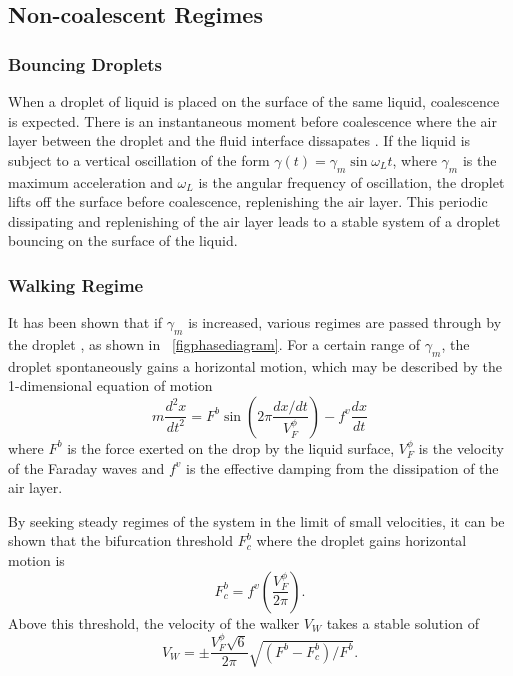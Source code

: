 \documentclass[11pt,twocolumn]{article}
\newcommand{\figref}[2][\figurename~]{#1\ref{#2}}
\begin{document}

\subsection{Non-coalescent Regimes}
\label{secnoncoalescentregimes}

\subsubsection{Bouncing Droplets}
\label{sec:bouncingregime}

When a droplet of liquid is placed on the surface of the same liquid, coalescence is expected.  There is an instantaneous moment before coalescence where the air layer between the droplet and the fluid interface dissapates \cite{2}.  If the liquid is subject to a vertical oscillation of the form $\gamma(t)=\gamma_m\sin\omega_L t$, where $\gamma_m$ is the maximum acceleration and $\omega_L$ is the angular frequency of oscillation, the droplet lifts off the surface before coalescence, replenishing the air layer.  This periodic dissipating and replenishing of the air layer leads to a stable system of a droplet bouncing on the surface of the liquid.


\subsubsection{Walking Regime}
\label{sec:walkingregime}
It has been shown that if $\gamma_m$ is increased, various regimes are passed through by the droplet \cite{9}, as shown in \figref{figphasediagram}.  For a certain range of $\gamma_m$, the droplet spontaneously gains a horizontal motion, which may be described by the 1-dimensional equation of motion
\begin{equation}
    \label{eqofmotion}
    m\frac{d^2x}{dt^2}=F^b\sin\left(2\pi\frac{dx/dt}{V_F^\phi}\right)-f^v\frac{dx}{dt}
\end{equation}
where $F^b$ is the force exerted on the drop by the liquid surface, $V_F^\phi$ is the velocity of the Faraday waves and $f^v$ is the effective damping from the dissipation of the air layer.

By seeking steady regimes of the system in the limit of small velocities, it can be shown that the bifurcation threshold $F^b_c$ where the droplet gains horizontal motion is
\begin{equation}
    \label{walkingthreshold}
    F^b_c=f^v\left(\frac{V_F^\phi}{2\pi}\right).
\end{equation}
Above this threshold, the velocity of the walker $V_W$ takes a stable solution of
\begin{equation}
\label{walkervelocity}
V_W=\pm\frac{V_F^\phi\sqrt{6}}{2\pi}\sqrt{\left(F^b-F_c^b\right)/F^b}.
\end{equation}
\end{document}
